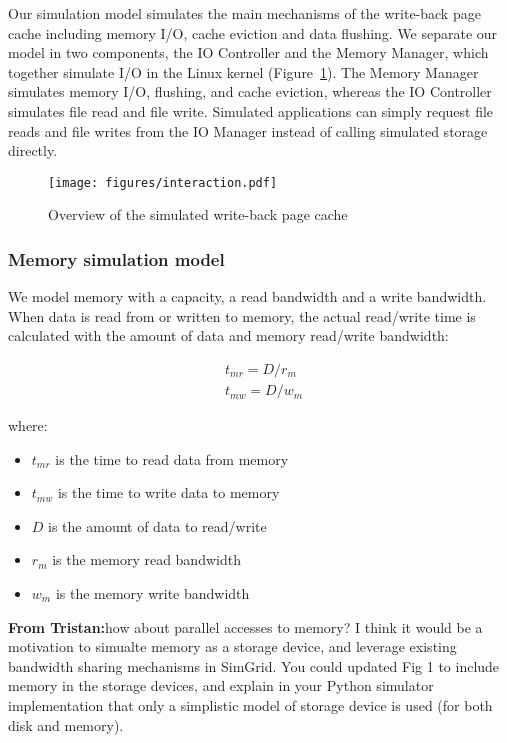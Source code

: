 \documentclass[conference]{IEEEtran}
\newcommand{\tristan}[1]{\color{orange}\textbf{From Tristan:}#1\color{black}}
\begin{document}
			Our simulation model simulates the main mechanisms of the
			write-back page cache including memory I/O, cache eviction and
			data flushing. We separate our model in two components, the IO
			Controller and the Memory Manager, which together simulate I/O
			in the Linux kernel (Figure~\ref{fig:interaction}). The Memory
			Manager simulates memory I/O, flushing, and cache eviction, whereas the
			IO Controller simulates file read and file write.
			Simulated applications can simply request
			file reads and file writes from the IO Manager
			instead of calling simulated storage directly.

			\begin{figure}
   				\centering
   				\texttt{[image: figures/interaction.pdf]}
   				\caption{Overview of the simulated write-back page cache}\label{fig:interaction}
			\end{figure}	

			\subsubsection{Memory simulation model}

			We model memory with a capacity, a read bandwidth and a write bandwidth. 
			When data is read from or written to memory, the actual 
			read/write time is calculated with the amount of data and memory 
			read/write bandwidth:
			
			\begin{align*}
				& t_{mr} = D / r_m \\ 
				& t_{mw} = D / w_m\
			\end{align*}		
			
			where:
			\begin{itemize}
				\item $t_{mr}$ is the time to read data from memory
				\item $t_{mw}$ is the time to write data to memory
				\item $D$ is the amount of data to read/write
				\item $r_m$ is the memory read bandwidth
				\item $w_m$ is the  memory write bandwidth
			\end{itemize}						

			\tristan{how about parallel accesses to memory? I think it would be a motivation to simualte memory as a storage device, 
			and leverage existing bandwidth sharing mechanisms in SimGrid. You could updated Fig 1 to include memory in the storage devices, and 
			explain in your Python simulator implementation that only a simplistic model of storage device is used (for both disk and memory).}
\end{document}
